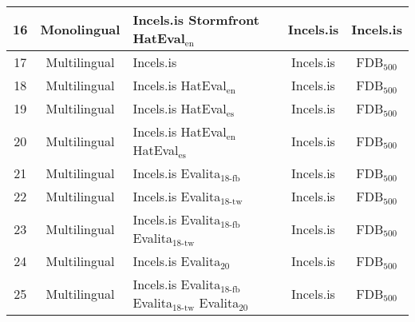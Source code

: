 \begin{tabular}{|c|c|p{4cm}|c|c|}
16 & Monolingual & Incels.is \newline Stormfront \newline HatEval$_{\mbox{en}}$ & Incels.is & Incels.is \\ \hline
17 & Multilingual & Incels.is & Incels.is & FDB$_{\mbox{500}}$ \\ \hline
18 & Multilingual & Incels.is \newline HatEval$_{\mbox{en}}$ & Incels.is & FDB$_{\mbox{500}}$ \\ \hline
19 & Multilingual & Incels.is \newline HatEval$_{\mbox{es}}$ & Incels.is & FDB$_{\mbox{500}}$ \\ \hline
20 & Multilingual & Incels.is \newline HatEval$_{\mbox{en}}$ \newline HatEval$_{\mbox{es}}$ & Incels.is & FDB$_{\mbox{500}}$ \\ \hline
21 & Multilingual & Incels.is \newline Evalita$_{\mbox{18-fb}}$ & Incels.is & FDB$_{\mbox{500}}$ \\ \hline
22 & Multilingual & Incels.is \newline Evalita$_{\mbox{18-tw}}$ & Incels.is & FDB$_{\mbox{500}}$ \\ \hline
23 & Multilingual & Incels.is \newline Evalita$_{\mbox{18-fb}}$ \newline Evalita$_{\mbox{18-tw}}$ & Incels.is & FDB$_{\mbox{500}}$ \\ \hline
24 & Multilingual & Incels.is \newline Evalita$_{\mbox{20}}$ & Incels.is & FDB$_{\mbox{500}}$ \\ \hline
25 & Multilingual & Incels.is \newline Evalita$_{\mbox{18-fb}}$ \newline Evalita$_{\mbox{18-tw}}$ \newline Evalita$_{\mbox{20}}$ & Incels.is & FDB$_{\mbox{500}}$ \\ \hline
\end{tabular}